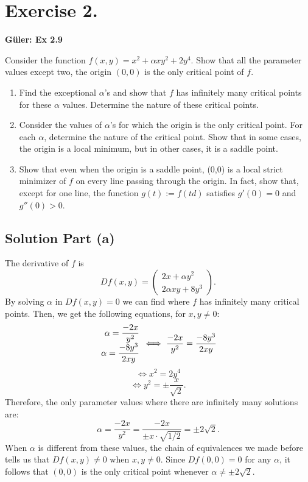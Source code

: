 \section*{Exercise 2.}

\textbf{Güler: Ex 2.9 }

Consider the function $f(x,y) = x^2 + \alpha xy^2 + 2 y^4$. Show that all the parameter values except two, the origin $(0,0)$ is the only critical point of $f$.

\begin{enumerate}[label=\alph*)]
    \item Find the exceptional $\alpha$'s and show that $f$ has infinitely many critical points for these $\alpha$ values. Determine the nature of these critical points.
    \item Consider the values of $\alpha$'s for which the origin is the only critical point. For each $\alpha$, determine the nature of the critical point. Show that in some cases, the origin is a local minimum, but in other cases, it is a saddle point.
    \item Show that even when the origin is a saddle point, (0,0) is a local strict minimizer of $f$ on every line passing through the origin. In fact, show that, except for one line, the function $g(t) := f(td)$ satisfies $g'(0) = 0$ and $g''(0) > 0$.
\end{enumerate}

\subsection*{Solution Part (a)}
The derivative of $f$ is
\[ Df(x,y) = \left( \begin{array}{c}
    2x + \alpha y^2\\
    2\alpha x y + 8y^3
\end{array} \right). \]
By solving $\alpha$ in $Df(x,y) = 0$ we can find where $f$ has infinitely many critical points. Then, we get the following equations, for $x,y \neq 0$:
\[ \everymath{\displaystyle}
\arraycolsep=1.8pt\def\arraystretch{1.5}
\begin{array}{rcl}
    \alpha = \frac{-2x}{y^2}\\
    \alpha = \frac{-8y^3}{2x y}
\end{array} \iff \frac{-2x}{y^2} = \frac{-8y^3}{2x y} \]
\[ \iff x^2 = 2y^4 \]
\[ \iff y^2 = \pm \frac{x}{\sqrt{2}}. \]
Therefore, the only parameter values where there are infinitely many solutions are:
\[ \alpha = \frac{-2x}{y^2} =  \frac{-2x}{\pm x\cdot \sqrt{1/2}} = \pm 2\sqrt{2}.\]
When $\alpha$ is different from these values, the chain of equivalences we made before tells us that $Df (x,y) \neq 0$ when $x,y\neq 0$. Since $Df(0,0) = 0$ for any $\alpha$, it follows that $(0,0)$ is the only critical point whenever $\alpha \neq \pm 2\sqrt{2}$.


